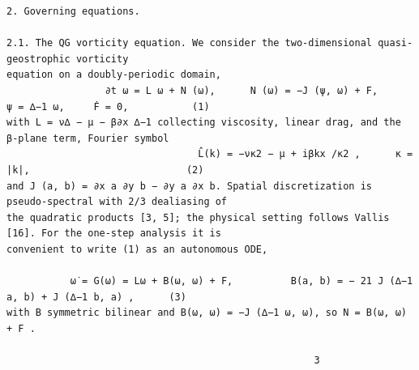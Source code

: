 \documentclass[letterpaper]{article}
\begin{document}
\begin{Verbatim}[fontsize=\fontsize{6.35}{7.15}\selectfont,breaklines=false]
2. Governing equations.

2.1. The QG vorticity equation. We consider the two-dimensional quasi-geostrophic vorticity
equation on a doubly-periodic domain,
                 ∂t ω = L ω + N (ω),      N (ω) = −J (ψ, ω) + F,      ψ = ∆−1 ω,     Ḟ = 0,           (1)
with L = ν∆ − μ − β∂x ∆−1 collecting viscosity, linear drag, and the β-plane term, Fourier symbol
                                 L̂(k) = −νκ2 − μ + iβkx /κ2 ,      κ = |k|,                           (2)
and J (a, b) = ∂x a ∂y b − ∂y a ∂x b. Spatial discretization is pseudo-spectral with 2/3 dealiasing of
the quadratic products [3, 5]; the physical setting follows Vallis [16]. For the one-step analysis it is
convenient to write (1) as an autonomous ODE,
                                                                                           
           ω̇ = G(ω) = Lω + B(ω, ω) + F,          B(a, b) = − 21 J (∆−1 a, b) + J (∆−1 b, a) ,      (3)
with B symmetric bilinear and B(ω, ω) = −J (∆−1 ω, ω), so N = B(ω, ω) + F .

                                                     3
\end{Verbatim}
\newpage
\end{document}
